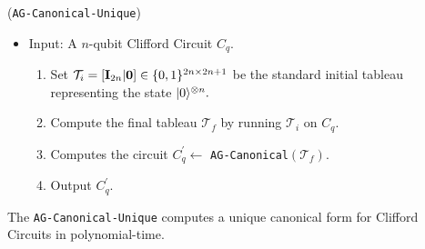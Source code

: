 

\begin{framed}
\begin{flushleft}
({\tt AG-Canonical-Unique})
\begin{itemize}
\item[] Input: A $n$-qubit Clifford Circuit $C_q.$
\begin{enumerate}
\item Set $\mathcal{T}_i=[{\bf I}_{2n}|{\bf 0}]\in \{0,1\}^{2n \times 2n+1}$ be the standard  initial tableau  representing the state ${\lvert}0\rangle^{\otimes n}.$
\item Compute the final tableau $\mathcal{T}_f$ by running $\mathcal{T}_i$ on $C_q.$
\item Computes  the circuit $C_q^\prime \leftarrow$ {\tt AG-Canonical}$(\mathcal{T}_f).$
\item Output $C_q^\prime.$
\end{enumerate}
\end{itemize}
\end{flushleft}
\end{framed}

\begin{lemma}
The {\tt AG-Canonical-Unique} computes a unique canonical form for Clifford Circuits in polynomial-time.
\end{lemma}

